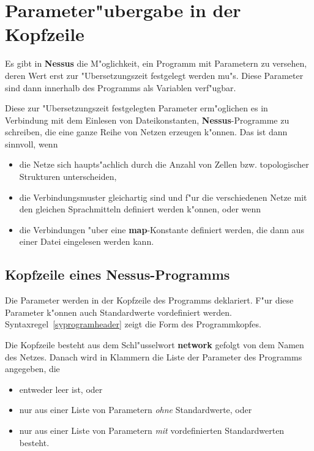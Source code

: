 \chapter{Parameter"ubergabe in der Kopfzeile}
\label{Parameter}


Es gibt in {\bf Nessus} die M"oglichkeit, ein Programm mit Parametern
zu versehen, deren Wert erst zur "Ubersetzungszeit festgelegt werden
mu"s. Diese Parameter sind dann innerhalb des Programms als Variablen
verf"ugbar.  

Diese zur "Ubersetzungszeit festgelegten Parameter erm"oglichen es in
Verbindung mit dem Einlesen von Dateikonstanten,
 {\bf
Nessus}-Programme zu schreiben, die eine ganze Reihe von Netzen
erzeugen k"onnen. Das ist dann sinnvoll, wenn

\begin{itemize}
  \item die Netze sich haupts"achlich durch die Anzahl von Zellen bzw. topologischer Strukturen
	unterscheiden, 
  \item die Verbindungsmuster gleichartig sind und f"ur die verschiedenen Netze mit den gleichen
	Sprachmitteln definiert werden k"onnen, oder wenn
  \item die Verbindungen "uber eine {\bf map}-Konstante definiert werden, die dann aus einer Datei
	eingelesen werden kann.
\end{itemize}

\section{Kopfzeile eines {\bf Nessus}-Programms}
\label{Kopfzeile}

Die Parameter werden in der Kopfzeile des Programms
deklariert. F"ur diese Parameter k"onnen auch
Standardwerte vordefiniert
werden.  Syntaxregel~\ref{syprogramheader} zeigt die Form des
Programmkopfes.

Die Kopfzeile
besteht aus dem Schl"usselwort {\bf network} gefolgt
von dem Namen des Netzes. Danach wird in Klammern die Liste der
Parameter des Programms  angegeben, die

\begin{itemize}
  \item entweder leer ist, oder
  \item nur aus einer Liste von Parametern {\it ohne\/} Standardwerte, oder
  \item nur aus einer Liste von Parametern {\it mit\/} vordefinierten Standardwerten besteht.
\end{itemize}

